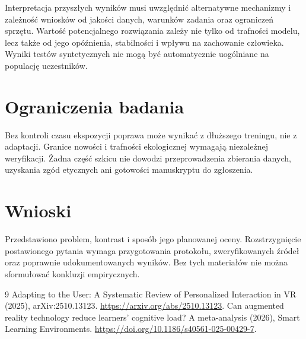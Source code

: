 \documentclass[11pt,a4paper]{article}
\begin{document}
Interpretacja przyszłych wyników musi uwzględnić alternatywne mechanizmy i zależność wniosków od jakości danych, warunków zadania oraz ograniczeń sprzętu. Wartość potencjalnego rozwiązania zależy nie tylko od trafności modelu, lecz także od jego opóźnienia, stabilności i wpływu na zachowanie człowieka. Wyniki testów syntetycznych nie mogą być automatycznie uogólniane na populację uczestników.

\section{Ograniczenia badania}

Bez kontroli czasu ekspozycji poprawa może wynikać z dłuższego treningu, nie z adaptacji. Granice nowości i trafności ekologicznej wymagają niezależnej weryfikacji. Żadna część szkicu nie dowodzi przeprowadzenia zbierania danych, uzyskania zgód etycznych ani gotowości manuskryptu do zgłoszenia.

\section{Wnioski}

Przedstawiono problem, kontrast i sposób jego planowanej oceny. Rozstrzygnięcie postawionego pytania wymaga przygotowania protokołu, zweryfikowanych źródeł oraz poprawnie udokumentowanych wyników. Bez tych materiałów nie można sformułować konkluzji empirycznych.

\begin{thebibliography}{9}
 Adapting to the User: A Systematic Review of Personalized Interaction in VR (2025), arXiv:2510.13123. \url{https://arxiv.org/abs/2510.13123}.
 Can augmented reality technology reduce learners' cognitive load? A meta-analysis (2026), Smart Learning Environments. \url{https://doi.org/10.1186/s40561-025-00429-7}.
\end{thebibliography}
\end{document}
